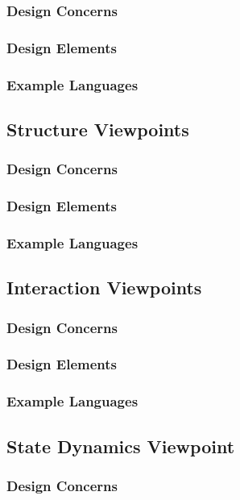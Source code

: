 \documentclass[letterpaper,10pt,titlepage,draftclsnofoot,onecolumn,onesided] {IEEEtran}
\begin{document}
\subsubsection{Design Concerns}
\subsubsection{Design Elements}
\subsubsection{Example Languages}

\subsection{Structure Viewpoints}
\subsubsection{Design Concerns}
\subsubsection{Design Elements}
\subsubsection{Example Languages}

\subsection{Interaction Viewpoints}
\subsubsection{Design Concerns}
\subsubsection{Design Elements}
\subsubsection{Example Languages}

\subsection{State Dynamics Viewpoint}
\subsubsection{Design Concerns}
\end{document}
